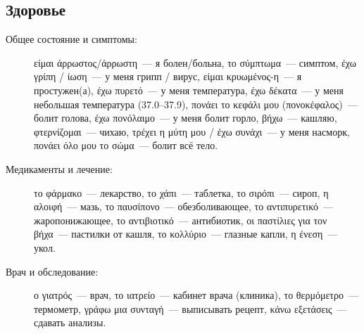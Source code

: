 \documentclass[12pt]{article}
\newenvironment{page}{\clearpage\normalsize\null\vfill}{\vfill\null}
\begin{document}
    \begin{page}
        \subsection{Здоровье}
        \footnotesize
        \begin{description}
            \item[Общее состояние и симптомы:]
            είμαι άρρωστος/άρρωστη~--- я болен/больна,
            το σύμπτωμα~--- симптом,
            έχω γρίπη / ίωση~--- у меня грипп / вирус,
            είμαι κρυωμένος-η~--- я простужен(а),
            έχω πυρετό~--- у меня температура,
            έχω δέκατα~--- у меня небольшая температура (37.0–37.9),
            πονάει το κεφάλι μου (πονοκέφαλος)~--- болит голова,
            έχω πονόλαιμο~--- у меня болит горло,
            βήχω~--- кашляю,
            φτερνίζομαι~--- чихаю,
            τρέχει η μύτη μου / έχω συνάχι~--- у меня насморк,
            πονάει όλο μου το σώμα~--- болит всё тело.

            \item[Медикаменты и лечение:]
            το φάρμακο~--- лекарство,
            το χάπι~--- таблетка,
            το σιρόπι~--- сироп,
            η αλοιφή~--- мазь,
            το παυσίπονο~--- обезболивающее,
            το αντιπυρετικό~--- жаропонижающее,
            το αντιβιοτικό~--- антибиотик,
            οι παστίλιες για τον βήχα~--- пастилки от кашля,
            το κολλύριο~--- глазные капли,
            η ένεση~--- укол.

            \item[Врач и обследование:]
            ο γιατρός~--- врач,
            το ιατρείο~--- кабинет врача (клиника),
            το θερμόμετρο~--- термометр,
            γράφω μια συνταγή~--- выписывать рецепт,
            κάνω εξετάσεις~--- сдавать анализы.
        \end{description}
    \end{page}
    
\end{document}
